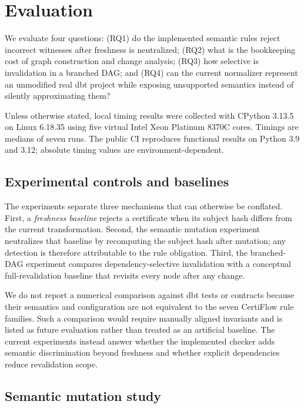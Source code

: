\section{Evaluation}

We evaluate four questions: (RQ1) do the implemented semantic rules reject incorrect witnesses after freshness is neutralized; (RQ2) what is the bookkeeping cost of graph construction and change analysis; (RQ3) how selective is invalidation in a branched DAG; and (RQ4) can the current normalizer represent an unmodified real dbt project while exposing unsupported semantics instead of silently approximating them?

Unless otherwise stated, local timing results were collected with CPython 3.13.5 on Linux 6.18.35 using five virtual Intel Xeon Platinum 8370C cores. Timings are medians of seven runs. The public CI reproduces functional results on Python 3.9 and 3.12; absolute timing values are environment-dependent.

\subsection{Experimental controls and baselines}

The experiments separate three mechanisms that can otherwise be conflated. First, a \emph{freshness baseline} rejects a certificate when its subject hash differs from the current transformation. Second, the semantic mutation experiment neutralizes that baseline by recomputing the subject hash after mutation; any detection is therefore attributable to the rule obligation. Third, the branched-DAG experiment compares dependency-selective invalidation with a conceptual full-revalidation baseline that revisits every node after any change.

We do not report a numerical comparison against dbt tests or contracts because their semantics and configuration are not equivalent to the seven CertiFlow rule families. Such a comparison would require manually aligned invariants and is listed as future evaluation rather than treated as an artificial baseline. The current experiments instead answer whether the implemented checker adds semantic discrimination beyond freshness and whether explicit dependencies reduce revalidation scope.

\subsection{Semantic mutation study}\label{sec:mutation}


